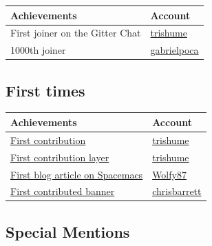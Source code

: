 \documentclass[11pt]{article}
\begin{document}
\begin{center}
\begin{tabular}{ll}
Achievements & Account\\
\hline
First joiner on the Gitter Chat & \href{https://github.com/trishume}{trishume}\\
1000th joiner & \href{https://github.com/gabrielpoca}{gabrielpoca}\\
\end{tabular}
\end{center}

\subsection{First times}
\label{sec:org3b0d870}

\begin{center}
\begin{tabular}{ll}
Achievements & Account\\
\hline
\href{https://github.com/syl20bnr/spacemacs/pull/19}{First contribution} & \href{https://github.com/trishume}{trishume}\\
\href{https://github.com/syl20bnr/spacemacs/commit/e802027d75d0c0aed55539b0da2dfa0df94dfd39}{First contribution layer} & \href{https://github.com/trishume}{trishume}\\
\href{http://oli.me.uk/2014/11/06/spacemacs-emacs-vim/}{First blog article on Spacemacs} & \href{https://github.com/Wolfy87}{Wolfy87}\\
\href{https://github.com/syl20bnr/spacemacs/commit/7b44a56263049482ed540ed6815a295633ffe9d1}{First contributed banner} & \href{https://github.com/chrisbarrett}{chrisbarrett}\\
\end{tabular}
\end{center}

\subsection{Special Mentions}
\label{sec:org7dedecf}
\end{document}
